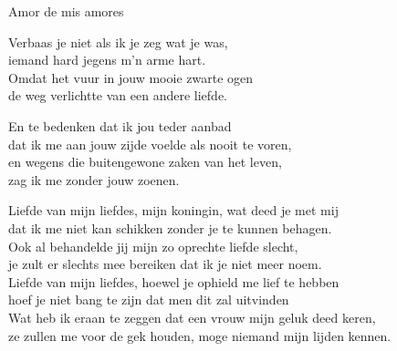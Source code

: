 \begin{song}[vals]{Amor de mis amores}

\clearpage
\begin{translation}
Verbaas je niet als ik je zeg wat je was,\\
iemand hard jegens m'n arme hart.\\
Omdat het vuur in jouw mooie zwarte ogen\\
de weg verlichtte van een andere liefde.\vspace{\wlskip}

En te bedenken dat ik jou teder aanbad\\
dat ik me aan jouw zijde voelde als nooit te voren,\\
en wegens die buitengewone zaken van het leven,\\
zag ik me zonder jouw zoenen.\vspace{\wlskip}

Liefde van mijn liefdes, mijn koningin, wat deed je met mij\\
dat ik me niet kan schikken zonder je te kunnen behagen.\\
Ook al behandelde jij mijn zo oprechte liefde slecht,\\
je zult er slechts mee bereiken dat ik je niet meer noem.\\
Liefde van mijn liefdes, hoewel je ophield me lief te hebben\\
hoef je niet bang te zijn dat men dit zal uitvinden\\
Wat heb ik eraan te zeggen dat een vrouw mijn geluk deed keren,\\
ze zullen me voor de gek houden, moge niemand mijn lijden kennen.
\end{translation}

\end{song}
